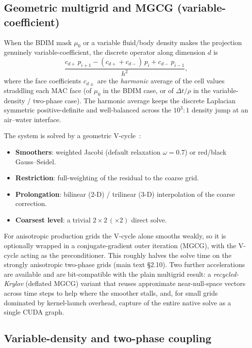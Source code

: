 \documentclass[10pt,onecolumn]{article}
\begin{document}
\subsection{Geometric multigrid and MGCG (variable-coefficient)}

When the BDIM mask $\mu_0$ or a variable fluid/body density makes the
projection genuinely variable-coefficient, the discrete operator along
dimension $d$ is
\begin{equation}
  \frac{c_{d+}\,p_{i+1}-(c_{d+}+c_{d-})\,p_i+c_{d-}\,p_{i-1}}{h^2},
  \label{eq:s-mg-stencil}
\end{equation}
where the face coefficients $c_{d\pm}$ are the \emph{harmonic} average of
the cell values straddling each MAC face (of $\mu_0$ in the BDIM case,
or of $\Delta t/\rho$ in the variable-density / two-phase case).  The
harmonic average keeps the discrete Laplacian symmetric
positive-definite and well-balanced across the $10^3{:}1$ density jump
at an air--water interface.

The system is solved by a geometric V-cycle~\cite{trottenberg2001multigrid}:

\begin{itemize}
\item \textbf{Smoothers}: weighted Jacobi (default relaxation
  $\omega=0.7$) or red/black Gauss--Seidel.
\item \textbf{Restriction}: full-weighting of the residual to the
  coarse grid.
\item \textbf{Prolongation}: bilinear (2-D) / trilinear (3-D)
  interpolation of the coarse correction.
\item \textbf{Coarsest level}: a trivial $2\times2\,(\times2)$ direct
  solve.
\end{itemize}

For anisotropic production grids the V-cycle alone smooths weakly, so it
is optionally wrapped in a conjugate-gradient outer iteration (MGCG),
with the V-cycle acting as the preconditioner.  This roughly halves the
solve time on the strongly anisotropic two-phase grids (main text
\S2.10).  Two further accelerations are available and are bit-compatible
with the plain multigrid result: a \emph{recycled-Krylov} (deflated
MGCG) variant that reuses approximate near-null-space vectors across
time steps to help where the smoother stalls, and, for small grids
dominated by kernel-launch overhead, capture of the entire native solve
as a single CUDA graph.

\subsection{Variable-density and two-phase coupling}
\end{document}
